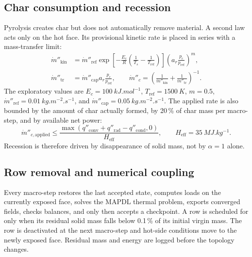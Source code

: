 \documentclass[oneside,openany]{amsdtx}
\begin{document}
\subsection{Char consumption and recession}
Pyrolysis creates char but does not automatically remove material. A second law
acts only on the hot face. Its provisional kinetic rate is placed in series
with a mass-transfer limit:
\begin{align}
 \dot m''_{\mathrm{kin}}&=\dot m''_{\mathrm{ref}}
 \exp\!\left[-\frac{E_c}{R}\left(\frac1{T_s}-\frac1{T_{\mathrm{ref}}}\right)\right]
 \left(a_r\frac{p_c}{p_{\mathrm{ref}}}\right)^{m},\\
 \dot m''_{\mathrm{tr}}&=\dot m''_{\mathrm{cap}}
 a_r\frac{p_c}{p_{\mathrm{ref}}},\qquad
 \dot m''_c=\left(\frac1{\dot m''_{\mathrm{kin}}}
 +\frac1{\dot m''_{\mathrm{tr}}}\right)^{-1}.
 \label{eq:v0-char}
\end{align}
The exploratory values are \(E_c=\SI{100}{kJ.mol^{-1}}\),
\(T_{\mathrm{ref}}=\SI{1500}{K}\), \(m=0.5\),
\(\dot m''_{\mathrm{ref}}=\SI{0.01}{kg.m^{-2}.s^{-1}}\), and
\(\dot m''_{\mathrm{cap}}=\SI{0.05}{kg.m^{-2}.s^{-1}}\). The applied rate is
also bounded by the amount of char actually formed, by 20\,\% of char mass per
macro-step, and by available net power:
\begin{equation}
 \dot m''_{c,\mathrm{applied}}\leq
 \frac{\max(q''_{\mathrm{conv}}+q''_{\mathrm{rad}}-q''_{\mathrm{cond}},0)}
 {H_{\mathrm{eff}}},\qquad H_{\mathrm{eff}}=\SI{35}{MJ.kg^{-1}}.
 \label{eq:v0-energy-cap}
\end{equation}
Recession is therefore driven by disappearance of solid mass, not by
\(\alpha=1\) alone.

\subsection{Row removal and numerical coupling}
Every macro-step restores the last accepted state, computes loads on the
currently exposed face, solves the MAPDL thermal problem, exports converged
fields, checks balances, and only then accepts a checkpoint. A row is scheduled
for  only when its residual solid mass falls below 0.1\,\% of its
initial virgin mass. The row is deactivated at the next macro-step and hot-side
conditions move to the newly exposed face. Residual mass and energy are logged
before the topology changes.
\end{document}
